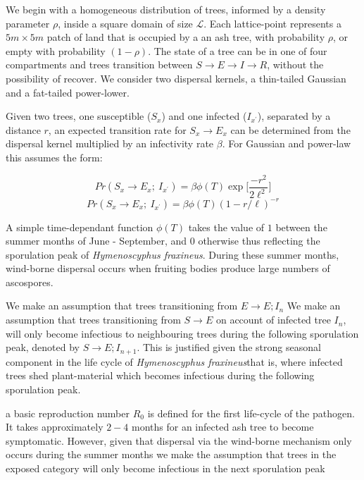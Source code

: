 We begin with a homogeneous distribution of trees, informed by a density parameter $\rho$, inside a square domain of size $\mathcal{L}$. Each lattice-point represents a $5m\times5m$ patch of land that is occupied by a an ash tree, with probability $\rho$, or empty with probability $(1-\rho)$. The state of a tree can be in one of four compartments and trees transition between $S\rightarrow E \rightarrow I \rightarrow R$, without the possibility of recover. We consider two dispersal kernels, a thin-tailed Gaussian and a fat-tailed power-lower.

Given two trees, one susceptible ($S_x$) and one infected ($I_{x^\prime}$), separated by a distance $r$, an expected transition rate for $S_x \rightarrow E_x$ can be determined from the dispersal kernel multiplied by an infectivity rate $\beta$. For Gaussian and power-law this assumes the form:

\begin{equation}
    Pr(S_{x} \rightarrow E_{x} ;\ I_{x^{\prime}} ) = \beta  \phi(T) \exp\Big[\frac{-r^2}{2\ell^2}\Big] 
\end{equation}
\begin{equation}
    Pr(S_{x} \rightarrow E_{x} ;\ I_{x^{\prime}} ) = \beta \phi(T) (1 - r/\ell)^{-r}
\end{equation}

A simple time-dependant function $\phi(T)$ takes the value of $1$ between the summer months of June - September, and $0$ otherwise thus reflecting the sporulation peak of \textit{Hymenoscyphus fraxineus}. During these summer months, wind-borne dispersal occurs when fruiting bodies produce large numbers of ascospores. 

We make an assumption that trees transitioning from $E\rightarrow E; I_{n}$
We make an assumption that trees transitioning from $S\rightarrow E$ on account of infected tree $I_{n}$, will only become infectious to neighbouring trees during the following sporulation peak, denoted by $S\rightarrow E; I_{n+1}$. This is justified given the strong seasonal component in the life cycle of \textit{Hymenoscyphus fraxineus}\textemdash that is, where infected trees shed plant-material which 
becomes infectious during the following sporulation peak. 

a basic reproduction number $R_0$ is defined for the first life-cycle of the pathogen.
It takes approximately $2-4$ months for an infected ash tree to become symptomatic. However, given that dispersal via the wind-borne mechanism only occurs during the summer months we make the assumption that trees in the exposed category will only become infectious in the next sporulation peak



